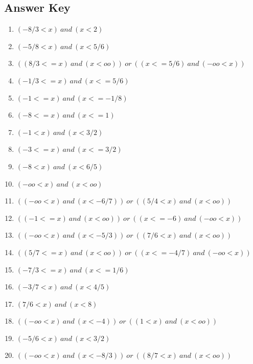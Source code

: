 \documentclass{article}
\begin{document}
\newpage

\subsection*{Answer Key}

\begin{enumerate}
\item $\displaystyle (-8/3 < x) \ and \  (x < 2) $ \ 
\item $\displaystyle (-5/8 < x) \ and \  (x < 5/6) $ \ 
\item $\displaystyle ((8/3 <= x) \ and \  (x < oo)) \ or \  ((x <= 5/6) \ and \  (-oo < x)) $ \ 
\item $\displaystyle (-1/3 <= x) \ and \  (x <= 5/6) $ \ 
\item $\displaystyle (-1 <= x) \ and \  (x <= -1/8) $ \ 
\item $\displaystyle (-8 <= x) \ and \  (x <= 1) $ \ 
\item $\displaystyle (-1 < x) \ and \  (x < 3/2) $ \ 
\item $\displaystyle (-3 <= x) \ and \  (x <= 3/2) $ \ 
\item $\displaystyle (-8 < x) \ and \  (x < 6/5) $ \ 
\item $\displaystyle (-oo < x) \ and \  (x < oo) $ \ 
\item $\displaystyle ((-oo < x) \ and \  (x < -6/7)) \ or \  ((5/4 < x) \ and \  (x < oo)) $ \ 
\item $\displaystyle ((-1 <= x) \ and \  (x < oo)) \ or \  ((x <= -6) \ and \  (-oo < x)) $ \ 
\item $\displaystyle ((-oo < x) \ and \  (x < -5/3)) \ or \  ((7/6 < x) \ and \  (x < oo)) $ \ 
\item $\displaystyle ((5/7 <= x) \ and \  (x < oo)) \ or \  ((x <= -4/7) \ and \  (-oo < x)) $ \ 
\item $\displaystyle (-7/3 <= x) \ and \  (x <= 1/6) $ \ 
\item $\displaystyle (-3/7 < x) \ and \  (x < 4/5) $ \ 
\item $\displaystyle (7/6 < x) \ and \  (x < 8) $ \ 
\item $\displaystyle ((-oo < x) \ and \  (x < -4)) \ or \  ((1 < x) \ and \  (x < oo)) $ \ 
\item $\displaystyle (-5/6 < x) \ and \  (x < 3/2) $ \ 
\item $\displaystyle ((-oo < x) \ and \  (x < -8/3)) \ or \  ((8/7 < x) \ and \  (x < oo)) $ \ 

\end{enumerate}
\end{document}
